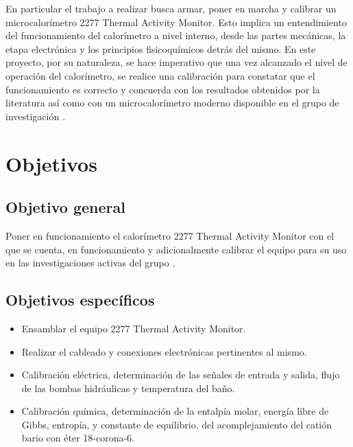 	En particular el trabajo a realizar busca armar, poner en marcha y calibrar un microcalorímetro 2277 Thermal Activity Monitor. Esto implica un entendimiento del funcionamiento del calorímetro a nivel interno, desde las partes mecánicas, la etapa electrónica y los principios fisicoquímicos detrás del mismo. En este proyecto, por su naturaleza, se hace imperativo que una vez alcanzado el nivel de operación del calorímetro, se realice una calibración para constatar que el funcionamiento es correcto y concuerda con los resultados obtenidos por la literatura así como con un microcalorímetro moderno disponible en el grupo de investigación \textit{\groupname}.
	
\section{Objetivos}
	\subsection{Objetivo general}
		Poner en funcionamiento el calorímetro 2277 Thermal Activity Monitor con el que se cuenta, en funcionamiento y adicionalmente calibrar el equipo para su uso en las investigaciones activas del grupo \groupname.
		
	\subsection{Objetivos específicos}
		\begin{itemize}
			\item Ensamblar el equipo 2277 Thermal Activity Monitor.
			\item Realizar el cableado y conexiones electrónicas pertinentes al mismo.
			\item Calibración eléctrica, determinación de las señales de entrada y salida, flujo de las bombas hidráulicas y temperatura del baño.
			\item Calibración química, determinación de la entalpía molar, energía libre de Gibbs, entropía, y constante de equilibrio, del acomplejamiento del catión bario con éter 18-corona-6.
		\end{itemize}

	\newpage

